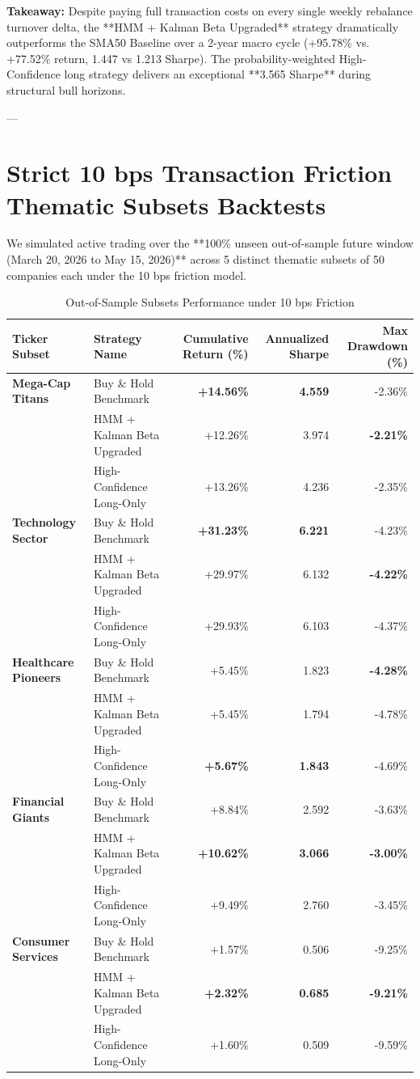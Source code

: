 \documentclass[11pt,article]{article}
\begin{document}
\textbf{Takeaway:} Despite paying full transaction costs on every single weekly rebalance turnover delta, the **HMM + Kalman Beta Upgraded** strategy dramatically outperforms the SMA50 Baseline over a 2-year macro cycle (+95.78\% vs. +77.52\% return, 1.447 vs 1.213 Sharpe). The probability-weighted High-Confidence long strategy delivers an exceptional **3.565 Sharpe** during structural bull horizons.

---

\section{Strict 10 bps Transaction Friction Thematic Subsets Backtests}
We simulated active trading over the **100\% unseen out-of-sample future window (March 20, 2026 to May 15, 2026)** across 5 distinct thematic subsets of 50 companies each under the 10 bps friction model.

\begin{table}[h!]
\centering
\caption{Out-of-Sample Subsets Performance under 10 bps Friction}
\begin{tabular}{llrrr}
\toprule
\textbf{Ticker Subset} & \textbf{Strategy Name} & \textbf{Cumulative Return (\%)} & \textbf{Annualized Sharpe} & \textbf{Max Drawdown (\%)} \\
\midrule
\textbf{Mega-Cap Titans} & Buy \& Hold Benchmark & \textbf{+14.56\%} & \textbf{4.559} & -2.36\% \\
 & HMM + Kalman Beta Upgraded & +12.26\% & 3.974 & \textbf{-2.21\%} \\
 & High-Confidence Long-Only & +13.26\% & 4.236 & -2.35\% \\
\midrule
\textbf{Technology Sector} & Buy \& Hold Benchmark & \textbf{+31.23\%} & \textbf{6.221} & -4.23\% \\
 & HMM + Kalman Beta Upgraded & +29.97\% & 6.132 & \textbf{-4.22\%} \\
 & High-Confidence Long-Only & +29.93\% & 6.103 & -4.37\% \\
\midrule
\textbf{Healthcare Pioneers} & Buy \& Hold Benchmark & +5.45\% & 1.823 & \textbf{-4.28\%} \\
 & HMM + Kalman Beta Upgraded & +5.45\% & 1.794 & -4.78\% \\
 & High-Confidence Long-Only & \textbf{+5.67\%} & \textbf{1.843} & -4.69\% \\
\midrule
\textbf{Financial Giants} & Buy \& Hold Benchmark & +8.84\% & 2.592 & -3.63\% \\
 & HMM + Kalman Beta Upgraded & \textbf{+10.62\%} & \textbf{3.066} & \textbf{-3.00\%} \\
 & High-Confidence Long-Only & +9.49\% & 2.760 & -3.45\% \\
\midrule
\textbf{Consumer Services} & Buy \& Hold Benchmark & +1.57\% & 0.506 & -9.25\% \\
 & HMM + Kalman Beta Upgraded & \textbf{+2.32\%} & \textbf{0.685} & \textbf{-9.21\%} \\
 & High-Confidence Long-Only & +1.60\% & 0.509 & -9.59\% \\
\bottomrule
\end{tabular}
\end{table}
\end{document}
